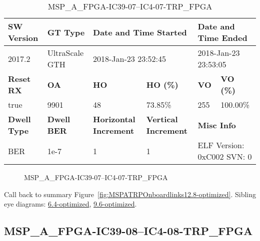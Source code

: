 \begin{table}[h]
\centering
\caption{MSP\_A\_FPGA-IC39-07--IC4-07-TRP\_FPGA}
\label{tab:MSPAFPGAIC3907IC407TRPFPGA12.8-optimized}
\begin{tabular}{@{}|l|l|l|l|l|l|@{}}
\toprule
\textbf{SW Version}                & \textbf{GT Type}   & \multicolumn{2}{l|}{\textbf{Date and Time Started}}            & \multicolumn{2}{l|}{\textbf{Date and Time Ended}}        \\ \midrule
2017.2                       & UltraScale GTH          & \multicolumn{2}{l|}{2018-Jan-23 23:52:45}                   & \multicolumn{2}{l|}{2018-Jan-23 23:53:05}               \\ \midrule
\textbf{Reset RX}                  & \textbf{OA} & \textbf{HO}   & \textbf{HO (\%)} & \textbf{VO} & \textbf{VO (\%)} \\ \midrule
true & 9901        & 48          & 73.85\%        & 255        & 100.00\%       \\ \midrule
\textbf{Dwell Type}                & \textbf{Dwell BER} & \textbf{Horizontal Increment} & \textbf{Vertical Increment}    & \multicolumn{2}{l|}{\textbf{Misc Info}}                  \\ \midrule
BER                            & 1e-7        & 1        & 1           & \multicolumn{2}{l|}{ELF Version: 0xC002 SVN: 0}                         \\ \bottomrule
\end{tabular}
\end{table}

\begin{figure}[h]
\caption{MSP\_A\_FPGA-IC39-07--IC4-07-TRP\_FPGA} \label{fig:MSPAFPGAIC3907IC407TRPFPGA12.8-optimized}
\end{figure}

Call back to summary Figure~\ref{fig:MSPATRPOnboardlinks12.8-optimized}.
Sibling eye diagrams: \hyperref[sec:MSPAFPGAIC3907IC407TRPFPGA6.4-optimized]{6.4-optimized}, \hyperref[sec:MSPAFPGAIC3907IC407TRPFPGA9.6-optimized]{9.6-optimized}.

\clearpage
\newpage


\subsection{MSP\_A\_FPGA-IC39-08--IC4-08-TRP\_FPGA}\label{sec:MSPAFPGAIC3908IC408TRPFPGA12.8-optimized}

